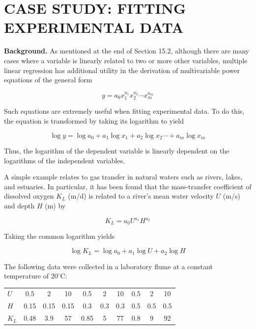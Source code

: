\documentclass[../main.tex]{subfiles}
\begin{document}
\section[CASE STUDY: FITTING EXPERIMENTAL DATA]{CASE STUDY: FITTING EXPERIMENTAL DATA}
\noindent\textbf{Background.} \quad As mentioned at the end of Section 15.2, although there are many cases where a variable is linearly related to two or more other variables, multiple linear regression has additional utility in the derivation of multivariable power equations of the general form

\begin{equation}
	\tag{15.14}
	y = a_0 x_1^{a_1} x_2^{a_2} \cdots x_m^{a_m} 
\end{equation}

\noindent Such equations are extremely useful when fitting experimental data. To do this, the equation is transformed by taking its logarithm to yield

\begin{equation}
	\tag{15.15}
	\log y = \log a_0 + a_1 \log x_1 + a_2 \log x_2 \cdots + a_m \log x_m
\end{equation}

\noindent Thus, the logarithm of the dependent variable is linearly dependent on the logarithms of the independent variables.

A simple example relates to gas transfer in natural waters such as rivers, lakes, and estuaries. In particular, it has been found that the mass-transfer coefficient of dissolved oxygen $K_L$ (m/d) is related to a river's mean water velocity $U$ (m/s) and depth $H$ (m) by

\begin{equation}
	\tag{15.16}
	K_L = a_0 U^{a_1} H^{a_2}
\end{equation}

\noindent Taking the common logarithm yields

\begin{equation}
	\tag{15.17}
	\log K_L = \log a_0 + a_1 \log U + a_2 \log H
\end{equation}

The following data were collected in a laboratory flume at a constant temperature of $20^\circ$C:

\begin{tabular}{l c c c c c c c c c}
	$U$ & 0.5 & 2 & 10 & 0.5 & 2 & 10 & 0.5 & 2 & 10 \\
	$H$ & 0.15 & 0.15 & 0.15 & 0.3 & 0.3 & 0.3 & 0.5 & 0.5 & 0.5 \\
	$K_L$ & 0.48 & 3.9 & 57 & 0.85 & 5 & 77 & 0.8 & 9 & 92
\end{tabular}
\end{document}
